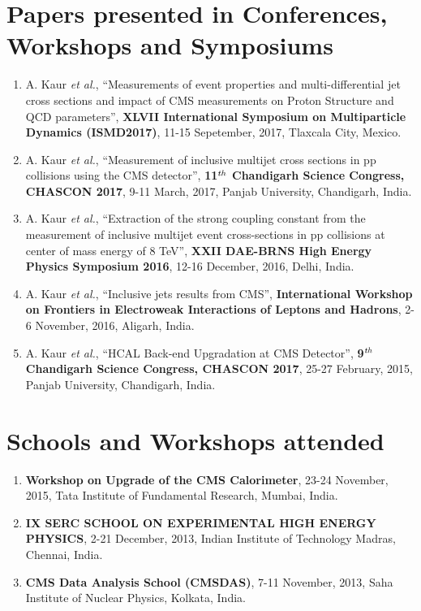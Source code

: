 \noindent\makebox[\textwidth]{\rule{\textwidth}{1pt}} 

\section*{Papers presented in Conferences, Workshops and Symposiums}
\begin{enumerate}
\item A. Kaur {\it et al.}, ``Measurements of event properties and multi-differential jet cross sections and impact of CMS measurements on Proton Structure and QCD parameters'', {\bf XLVII International Symposium on Multiparticle Dynamics (ISMD2017)}, 11-15 Sepetember, 2017, Tlaxcala City, Mexico.

\item A. Kaur {\it et al.}, ``Measurement of inclusive multijet cross sections in pp collisions using the CMS detector'', {\bf 11$^{\rm \it th}$ Chandigarh Science Congress, CHASCON 2017}, 9-11 March, 2017, Panjab University, Chandigarh, India.  

\item A. Kaur {\it et al.}, ``Extraction of the strong coupling constant from the measurement of inclusive multijet event cross-sections in pp collisions at center of mass energy of 8 TeV'', {\bf XXII DAE­-BRNS High Energy Physics Symposium 2016}, 12-16 December, 2016, Delhi, India.

\item A. Kaur {\it et al.}, ``Inclusive jets results from CMS'', {\bf International Workshop on Frontiers in Electroweak Interactions of Leptons and Hadrons}, 2-6 November, 2016, Aligarh, India.

\item A. Kaur {\it et al.}, ``HCAL Back-end Upgradation at CMS Detector'', {\bf 9$^{\rm \it th}$ Chandigarh Science Congress, CHASCON 2017}, 25-27 February, 2015, Panjab University, Chandigarh, India.

\end{enumerate}

\noindent\makebox[\textwidth]{\rule{\textwidth}{1pt}} 

\section*{Schools and Workshops attended}

\begin{enumerate}

\item {\bf Workshop on Upgrade of the CMS Calorimeter}, 23-24 November, 2015, Tata Institute of Fundamental Research, Mumbai, India.

\item {\bf IX SERC SCHOOL ON EXPERIMENTAL HIGH ENERGY PHYSICS}, 2-21 December, 2013, Indian Institute of Technology Madras, Chennai, India. 

\item {\bf CMS Data Analysis School (CMSDAS)}, 7-11 November, 2013, Saha Institute of Nuclear Physics, Kolkata, India.

\end{enumerate}

